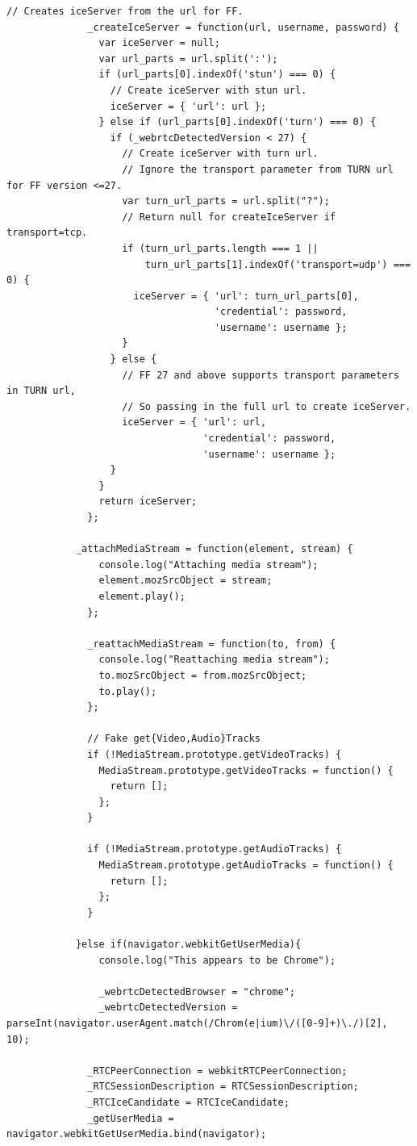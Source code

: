 \begin{appendices}
\begin{lstlisting}[caption={WebRTCService in application client},label={code:webrtc_service}]
  			// Creates iceServer from the url for FF.
			  _createIceServer = function(url, username, password) {
			    var iceServer = null;
			    var url_parts = url.split(':');
			    if (url_parts[0].indexOf('stun') === 0) {
			      // Create iceServer with stun url.
			      iceServer = { 'url': url };
			    } else if (url_parts[0].indexOf('turn') === 0) {
			      if (_webrtcDetectedVersion < 27) {
			        // Create iceServer with turn url.
			        // Ignore the transport parameter from TURN url for FF version <=27.
			        var turn_url_parts = url.split("?");
			        // Return null for createIceServer if transport=tcp.
			        if (turn_url_parts.length === 1 ||
			            turn_url_parts[1].indexOf('transport=udp') === 0) {
			          iceServer = { 'url': turn_url_parts[0],
			                        'credential': password,
			                        'username': username };
			        }
			      } else {
			        // FF 27 and above supports transport parameters in TURN url,
			        // So passing in the full url to create iceServer.
			        iceServer = { 'url': url,
			                      'credential': password,
			                      'username': username };
			      }
			    }
			    return iceServer;
			  };

  			_attachMediaStream = function(element, stream) {
			    console.log("Attaching media stream");
			    element.mozSrcObject = stream;
			    element.play();
			  };

			  _reattachMediaStream = function(to, from) {
			    console.log("Reattaching media stream");
			    to.mozSrcObject = from.mozSrcObject;
			    to.play();
			  };

			  // Fake get{Video,Audio}Tracks
			  if (!MediaStream.prototype.getVideoTracks) {
			    MediaStream.prototype.getVideoTracks = function() {
			      return [];
			    };
			  }

			  if (!MediaStream.prototype.getAudioTracks) {
			    MediaStream.prototype.getAudioTracks = function() {
			      return [];
			    };
			  }

			}else if(navigator.webkitGetUserMedia){
				console.log("This appears to be Chrome");

				_webrtcDetectedBrowser = "chrome";
				_webrtcDetectedVersion = parseInt(navigator.userAgent.match(/Chrom(e|ium)\/([0-9]+)\./)[2], 10);

			  _RTCPeerConnection = webkitRTCPeerConnection;
			  _RTCSessionDescription = RTCSessionDescription;
			  _RTCIceCandidate = RTCIceCandidate;
			  _getUserMedia = navigator.webkitGetUserMedia.bind(navigator);


\end{lstlisting}
\end{appendices}
